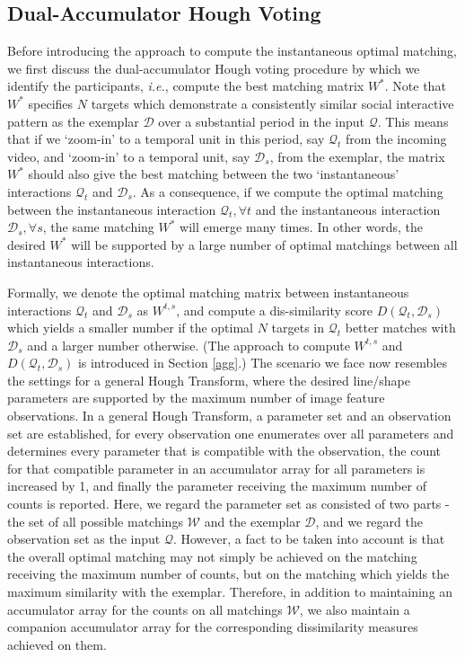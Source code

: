 \subsection{Dual-Accumulator Hough Voting}
\label{vote}

Before introducing the approach to compute the instantaneous optimal matching, we first discuss the dual-accumulator Hough voting procedure by which we identify the participants, \textit{i.e.}, compute the best matching matrix $W^{*}$. Note that  $W^{*}$ specifies $N$ targets which demonstrate a consistently similar social interactive pattern as the exemplar $\mathcal{D}$ over a substantial period in the input $\mathcal{Q}$. This means that if we `zoom-in' to a temporal unit in this period, say $\mathcal{Q}_{t}$ from the incoming video, and `zoom-in' to a temporal unit, say $\mathcal{D}_{s}$, from the exemplar, the matrix $W^{*}$ should also give the best matching between the two `instantaneous' interactions $\mathcal{Q}_{t}$ and $\mathcal{D}_{s}$. As a consequence, if we compute the optimal matching between the instantaneous interaction $\mathcal{Q}_{t}, \forall t$ and the instantaneous interaction $\mathcal{D}_{s}, \forall s$, the same matching $W^{*}$ will emerge many times. In other words, the desired $W^{*}$ will be supported by a large number of  optimal matchings between all instantaneous interactions. 

Formally, we denote the optimal matching matrix between instantaneous interactions $\mathcal{Q}_{t}$ and $\mathcal{D}_{s}$ as $W^{t,s}$, and compute a dis-similarity score $D(\mathcal{Q}_{t}, \mathcal{D}_{s})$ which yields a smaller number if the optimal $N$ targets in $\mathcal{Q}_{t}$ better matches with $\mathcal{D}_{s}$ and a larger number otherwise. (The approach to compute $W^{t,s}$ and $D(\mathcal{Q}_{t}, \mathcal{D}_{s})$ is introduced in Section \ref{agg}.) The scenario we face now resembles the settings for a general Hough Transform, where the desired line/shape parameters are supported by the maximum number of image feature observations. In a general Hough Transform, a parameter set and an observation set are established, for every observation one enumerates over all parameters and determines every parameter that is compatible with the observation, the count for that compatible parameter in an accumulator array for all parameters is increased by 1, and finally the parameter receiving the maximum number of counts is reported. Here, we regard the parameter set as consisted of two parts - the set of all possible matchings $\mathcal{W}$ and the exemplar $\mathcal{D}$, and we regard the observation set as the input $\mathcal{Q}$. However, a fact to be taken into account is that the overall optimal matching may not simply be achieved on the matching receiving the maximum number of counts, but on the matching which yields the maximum similarity with the exemplar. Therefore, in addition to maintaining an accumulator array for the counts on all matchings $\mathcal{W}$, we also maintain a companion accumulator array for the corresponding dissimilarity measures achieved on them. 

